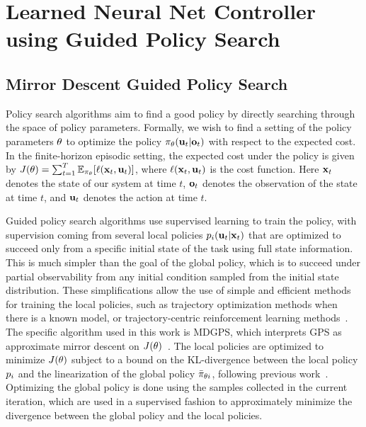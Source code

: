 \section{Learned Neural Net Controller using Guided Policy Search}
\label{learning_nn_gps}

\subsection{Mirror Descent Guided Policy Search}
\label{sec:mdgps}

Policy search algorithms aim to find a good policy by directly searching through
the space of policy parameters. Formally, we wish to find a setting of the
policy parameters $\theta$ to optimize the policy
$\pi_{\theta}(\mathbf{u}_t|\mathbf{o}_t)$ with respect to the expected cost. In the
finite-horizon episodic setting, the expected cost under the policy is given by
$J(\theta)=\sum_{t=1}^{T}\mathbb{E}_{\pi_{\theta}}[\ell(\mathbf{x}_t,\mathbf{u}_t)]$,
where $\ell(\mathbf{x}_t,\mathbf{u}_t)$ is the cost function. Here $\mathbf{x}_t$ denotes the state of our
system at time $t$, $\mathbf{o}_t$ denotes the observation of the state at time $t$,
and $\mathbf{u}_t$ denotes the action at time $t$.

Guided policy search algorithms use supervised learning to train the policy,
with supervision coming from several local policies $p_i(\mathbf{u}_t|\mathbf{x}_t)$ that
are optimized to succeed only from a specific initial state of the task using
full state information. This is much simpler than the goal of the global
policy, which is to succeed under partial observability from any initial
condition sampled from the initial state distribution. These simplifications
allow the use of simple and efficient methods for training the local policies,
such as trajectory optimization methods when there is a known model, or
trajectory-centric reinforcement learning methods~\cite{la-lnnpg-14}. The
specific algorithm used in this work is MDGPS, which interprets GPS as
approximate mirror descent on $J(\theta)$~\cite{ml-gpsam-16}. The local
policies are optimized to minimize $J(\theta)$ subject to a bound on the
KL-divergence between the local policy $p_i$ and the linearization of
the global policy $\bar{\pi}_{\theta{i}}$, following previous
work~\cite{bagnell2003covariant,ps-rlmsp-08,pma-reps-10,slmja-trpo-15}.
Optimizing the global policy is done using the samples collected in the current
iteration, which are used in a supervised fashion to approximately minimize the
divergence between the global policy and the local policies.

